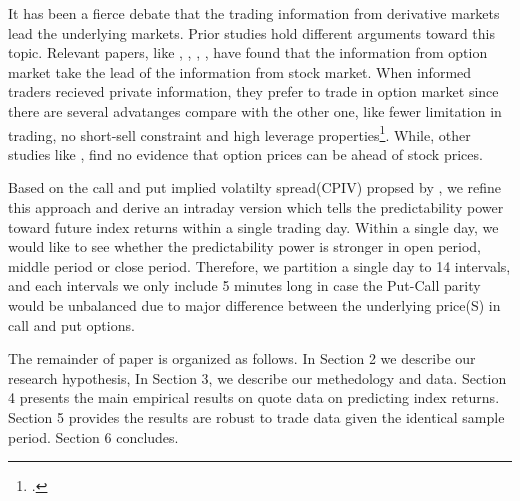



It has been a fierce debate that the trading information from derivative markets lead the underlying markets. Prior studies hold different arguments toward this topic. Relevant papers, like \textcite{manaster1982option}, \textcite{anthony1988interrelation}, \textcite{chakravarty2004informed}, 
\textcite{cremers2010deviations}, 
\textcite{xing2010does} have found that the information from option market take the lead of the information from stock market. 
When informed traders recieved private information, they prefer to trade in option market since there are several advatanges compare with the other one, like fewer limitation in trading, no short-sell constraint and high leverage properties\footcite{black1975fact, fleming1996trading}. While, other studies like 
\textcite{chan1993option}, 
\textcite{stephan1990intraday} find no evidence that option prices can be ahead of stock prices. 

Based on the call and put implied volatilty spread(CPIV) propsed by \textcite{cremers2010deviations}, we refine this approach and derive an intraday version which tells the predictability power toward future index returns within a single trading day. Within a single day, we would like to see whether the predictability power is stronger in open period, middle period or close period. Therefore, we partition a single day to 14 intervals, and each intervals we only include 5 minutes long in case the Put-Call parity would be unbalanced due to major difference between the underlying price(S) in call and put options. 

The remainder of paper is organized as follows. In Section 2 we describe our research hypothesis, In Section 3, we describe our methedology and data. Section 4 presents the main empirical results on quote data on predicting index returns. Section 5 provides the results are robust to trade data given the identical sample period. Section 6 concludes. 